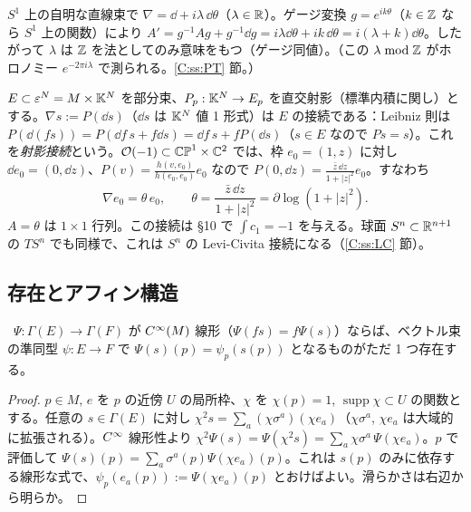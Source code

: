 \begin{ex}\label{C:ex:S1conn}
$S^1$ 上の自明な直線束で $\nabla=\dd+i\lambda\,\dd\theta$（$\lambda\in\mathbb R$）。ゲージ変換 $g=e^{ik\theta}$（$k\in\mathbb Z$ なら $S^1$ 上の関数）により $A'=g^{-1}A g+g^{-1}\dd g=i\lambda\dd\theta+ik\,\dd\theta=i(\lambda+k)\dd\theta$。したがって $\lambda$ は $\mathbb Z$ を法としてのみ意味をもつ（ゲージ同値）。（この $\lambda\bmod\mathbb Z$ がホロノミー $e^{-2\pi i\lambda}$ で測られる。\ref{C:ss:PT} 節。）
\end{ex}

\begin{ex}\label{C:ex:proj}
$E\subset\varepsilon^N=M\times\mathbb K^N$ を部分束、$P_p:\mathbb K^N\to E_p$ を直交射影（標準内積に関し）とする。$\nabla s:=P(\dd s)$（$\dd s$ は $\mathbb K^N$ 値 1 形式）は $E$ の接続である：Leibniz 則は $P(\dd(fs))=P(\dd f\,s+f\dd s)=\dd f\,s+fP(\dd s)$（$s\in E$ なので $Ps=s$）。これを\emph{射影接続}という。$\mathcal O(-1)\subset\mathbb{CP}^1\times\mathbb C^2$ では、枠 $e_0=(1,z)$ に対し $\dd e_0=(0,\dd z)$、$P(v)=\frac{h(v,e_0)}{h(e_0,e_0)}e_0$ なので $P(0,\dd z)=\frac{\bar z\,\dd z}{1+|z|^2}e_0$。すなわち
\[
\nabla e_0=\theta\,e_0,\qquad\theta=\frac{\bar z\,\dd z}{1+|z|^2}=\partial\log(1+|z|^2).
\]
$A=\theta$ は $1\times1$ 行列。この接続は §10 で $\int c_1=-1$ を与える。球面 $S^n\subset\mathbb R^{n+1}$ の $TS^n$ でも同様で、これは $S^n$ の Levi-Civita 接続になる（\ref{C:ss:LC} 節）。
\end{ex}

\subsection{存在とアフィン構造}
\begin{lem}[テンソル性]\label{C:lem:tensor}\tP\
$\Psi:\Gamma(E)\to\Gamma(F)$ が $C^\infty(M)$ 線形（$\Psi(fs)=f\Psi(s)$）ならば、ベクトル束の準同型 $\psi:E\to F$ で $\Psi(s)(p)=\psi_p(s(p))$ となるものがただ 1 つ存在する。
\end{lem}
\begin{proof}
$p\in M$, $e$ を $p$ の近傍 $U$ の局所枠、$\chi$ を $\chi(p)=1$, $\operatorname{supp}\chi\subset U$ の関数とする。任意の $s\in\Gamma(E)$ に対し $\chi^2s=\sum_a(\chi\sigma^a)(\chi e_a)$（$\chi\sigma^a$, $\chi e_a$ は大域的に拡張される）。$C^\infty$ 線形性より $\chi^2\Psi(s)=\Psi(\chi^2s)=\sum_a\chi\sigma^a\,\Psi(\chi e_a)$。$p$ で評価して $\Psi(s)(p)=\sum_a\sigma^a(p)\Psi(\chi e_a)(p)$。これは $s(p)$ のみに依存する線形な式で、$\psi_p(e_a(p)):=\Psi(\chi e_a)(p)$ とおけばよい。滑らかさは右辺から明らか。
\end{proof}


